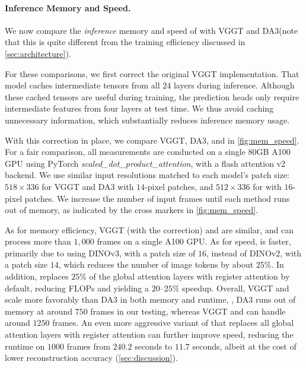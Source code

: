 \paragraph{Inference Memory and Speed.}



We now compare the \emph{inference} memory and speed of \method with VGGT and DA3\@ (note that this is quite different from the training efficiency discussed in \cref{sec:architecture}).

For these comparisons, we first correct the original VGGT implementation.
That model caches intermediate tensors from all $24$ layers during inference.
Although these cached tensors are useful during training, the prediction heads only require intermediate features from four layers at test time.
We thus avoid caching unnecessary information, which substantially reduces inference memory usage.

With this correction in place, we compare VGGT, DA3, and \method in \cref{fig:mem_speed}. 
For a fair comparison, all measurements are conducted on a single 80GB A100 GPU using PyTorch \textit{scaled\_dot\_product\_attention}, with a flash attention v2 backend. 
We use similar input resolutions matched to each model's patch size: $518 \times 336$ for VGGT and DA3 with $14$-pixel patches, and $512 \times 336$ for \method with $16$-pixel patches.
We increase the number of input frames until each method runs out of memory, as indicated by the cross markers in \cref{fig:mem_speed}.

As for memory efficiency, VGGT (with the correction) and \method are similar, and can process more than $1,\!000$ frames on a single A100 GPU\@.
As for speed, \method is faster, primarily due to using DINOv3, with a patch size of $16$, instead of DINOv2, with a patch size $14$, which reduces the number of image tokens by about $25\%$.
In addition, \method replaces $25\%$ of the global attention layers with register attention by default, reducing FLOPs and yielding a $20$--$25\%$ speedup.
Overall, VGGT and \method scale more favorably than DA3 in both memory and runtime, \eg, DA3 runs out of memory at around $750$ frames in our testing, whereas VGGT and \method can handle around $1250$ frames.
An even more aggressive variant of \method that replaces all global attention layers with register attention can further improve speed, reducing the runtime on $1000$ frames from $240.2$ seconds to $11.7$ seconds, albeit at the cost of lower reconstruction accuracy (\cref{sec:discussion}).


